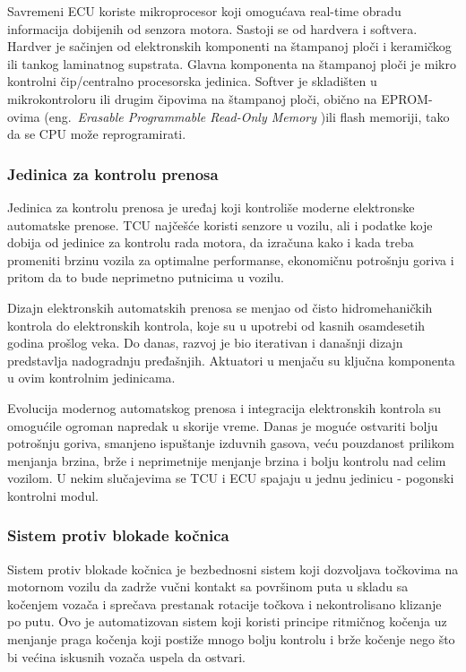 \documentclass[a4paper]{article}
\begin{document}
Savremeni ECU koriste mikroprocesor koji omogućava real-time obradu informacija dobijenih od senzora motora. Sastoji se od hardvera i softvera. Hardver je sačinjen od elektronskih komponenti na štampanoj ploči i keramičkog ili tankog laminatnog supstrata. Glavna komponenta na štampanoj ploči je mikro kontrolni čip/centralno procesorska jedinica. Softver je skladišten u mikrokontroloru ili drugim čipovima na štampanoj ploči, obično na EPROM-ovima (eng.{~\em Erasable Programmable Read-Only Memory} \cite{EPROM})ili flash memoriji, tako da se CPU može reprogramirati.

\subsubsection{Jedinica za kontrolu prenosa}
\label{subsubsec:TCU}

Jedinica za kontrolu prenosa je uređaj koji kontroliše moderne elektronske automatske prenose. TCU najčešće koristi senzore u vozilu, ali i podatke koje dobija od jedinice za kontrolu rada motora, da izračuna kako i kada treba promeniti brzinu vozila za optimalne performanse, ekonomičnu potrošnju goriva i pritom da to bude neprimetno putnicima u vozilu.

Dizajn elektronskih automatskih prenosa se menjao od čisto hidromehaničkih kontrola do elektronskih kontrola, koje su u upotrebi od kasnih osamdesetih godina prošlog veka. Do danas, razvoj je bio iterativan i današnji dizajn predstavlja nadogradnju pređašnjih. Aktuatori u menjaču su ključna komponenta u ovim kontrolnim jedinicama.

Evolucija modernog automatskog prenosa i integracija elektronskih kontrola su omogućile ogroman napredak u skorije vreme. Danas je moguće ostvariti bolju potrošnju goriva, smanjeno ispuštanje izduvnih gasova, veću pouzdanost prilikom menjanja brzina, brže i neprimetnije menjanje brzina i bolju kontrolu nad celim vozilom.
U nekim slučajevima se TCU i ECU spajaju u jednu jedinicu - pogonski kontrolni modul.

\subsubsection{Sistem protiv blokade kočnica}
\label{subsubsec:ABS}

Sistem protiv blokade kočnica je bezbednosni sistem koji dozvoljava točkovima na motornom vozilu da zadrže vučni kontakt sa površinom puta u skladu sa kočenjem vozača i sprečava prestanak rotacije točkova i nekontrolisano klizanje po putu. Ovo je automatizovan sistem koji koristi principe ritmičnog kočenja uz menjanje praga kočenja koji postiže mnogo bolju kontrolu i brže kočenje nego što bi većina iskusnih vozača uspela da ostvari.
\end{document}
